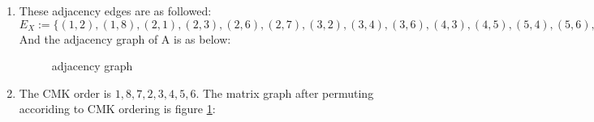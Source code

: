 \documentclass{ctexart}
\begin{document}
\begin{solution}
  \begin{enumerate}
    \item These adjacency edges are as followed: 
      \(E_X:=\{(1,2),(1,8),(2,1),(2,3),(2,6),(2,7),(3,2),(3,4),(3,6),(4,3),(4,5),(5,4),(5,6),
  (6,3),(6,2),(6,5),(6,7),(7,6),(7,2),(7,8),(8,1),(8,7)\} \) 
      And the adjacency graph of A is as below: 
        \begin{figure}[!htbp]
    \centering
            \caption{adjacency graph}\label{fig:adj}
          \end{figure}
    \item The CMK order is \(1,8,7,2,3,4,5,6 \). 
      The matrix graph after permuting accoriding to CMK ordering is figure \ref{fig:adj}:


\end{enumerate}
\end{solution}
\end{document}
